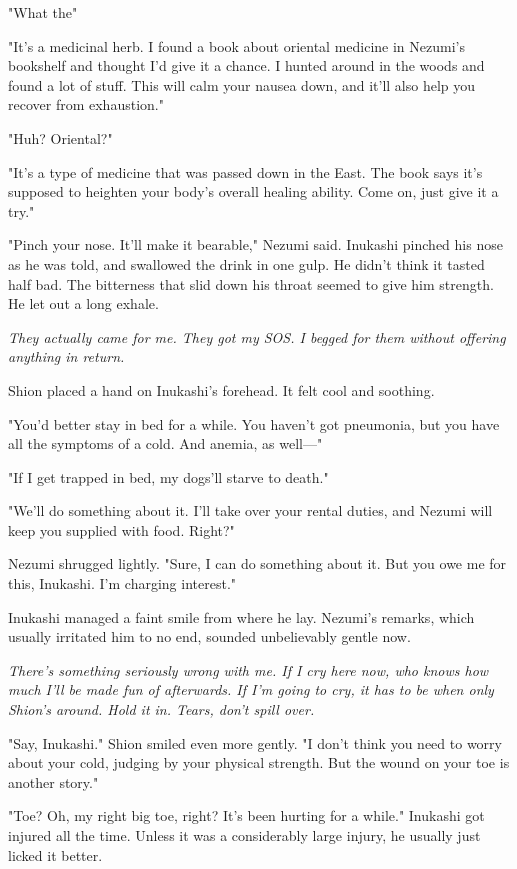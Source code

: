 "What the\el "

"It's a medicinal herb. I found a book about oriental medicine in
Nezumi's bookshelf and thought I'd give it a chance. I hunted around in
the woods and found a lot of stuff. This will calm your nausea down, and
it'll also help you recover from exhaustion."

"\el Huh? Oriental?"

"It's a type of medicine that was passed down in the East. The book says
it's supposed to heighten your body's overall healing ability. Come on,
just give it a try."

"Pinch your nose. It'll make it bearable," Nezumi said. Inukashi pinched
his nose as he was told, and swallowed the drink in one gulp. He didn't
think it tasted half bad. The bitterness that slid down his throat
seemed to give him strength. He let out a long exhale.

\emph{They actually came for me. They got my SOS. I begged for them without
offering anything in return.}

Shion placed a hand on Inukashi's forehead. It felt cool and soothing.

"You'd better stay in bed for a while. You haven't got pneumonia, but
you have all the symptoms of a cold. And anemia, as well---"

"If I get trapped in bed, my dogs'll starve to death."

"We'll do something about it. I'll take over your rental duties, and
Nezumi will keep you supplied with food. Right?"

Nezumi shrugged lightly. "Sure, I can do something about it. But you owe
me for this, Inukashi. I'm charging interest."

Inukashi managed a faint smile from where he lay. Nezumi's remarks,
which usually irritated him to no end, sounded unbelievably gentle now.

\emph{There's something seriously wrong with me. If I cry here now, who knows
how much I'll be made fun of afterwards. If I'm going to cry, it has to
be when only Shion's around. Hold it in. Tears, don't spill over.}

"Say, Inukashi." Shion smiled even more gently. "I don't think you need
to worry about your cold, judging by your physical strength. But the
wound on your toe is another story."

"Toe? Oh, my right big toe, right? It's been hurting for a while."
Inukashi got injured all the time. Unless it was a considerably large
injury, he usually just licked it better.

